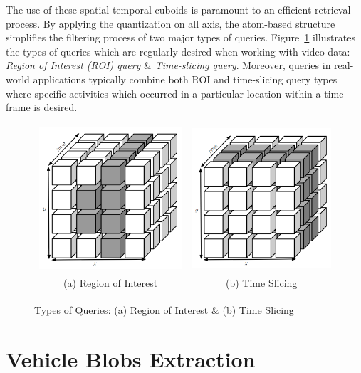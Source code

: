 The use of these spatial-temporal cuboids is paramount to an efficient retrieval process. 
By applying the quantization on all axis, the atom-based structure simplifies the filtering process of two major types of queries.
Figure~\ref{fig:typesofQuery} illustrates the types of queries which are regularly desired when working with video data: \textit{Region of Interest (ROI) query} \& \textit{Time-slicing query}.
Moreover, queries in real-world applications typically combine both ROI and time-slicing query types where specific activities which occurred in a particular location within a time frame is desired.

\begin{figure}[htb!]
  \centering
  \begin{tabular}{cc}
  \includegraphics[width=0.3\linewidth]{image/general/atom_ROI.PNG} &
  \includegraphics[width=0.3\linewidth]{image/general/atom_time_slicing.PNG}\\
  (a) Region of Interest & (b) Time Slicing
  \end{tabular}
  \caption{Types of Queries: (a) Region of Interest \& (b) Time Slicing}
  \label{fig:typesofQuery}
\end{figure}

\section{Vehicle Blobs Extraction}
\label{subsection:fundamental}

